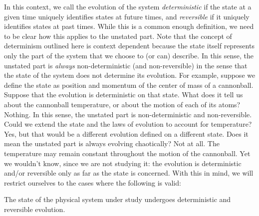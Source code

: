 \documentclass[smallextended]{svjour3}
\numberwithin{equation}{section}
\begin{document}
In this context, we call the evolution of the system \emph{deterministic} if the state at a given time uniquely identifies states at future times, and \emph{reversible} if it uniquely identifies states at past times. While this is a common enough definition, we need to be clear how this applies to the unstated part. Note that the concept of determinism outlined here is context dependent because the state itself represents only the part of the system that we choose to (or can) describe. In this sense, the unstated part is \emph{always} non-deterministic (and non-reversible) in the sense that the state of the system does not determine its evolution. For example, suppose we define the state as position and momentum of the center of mass of a cannonball. Suppose that the evolution is deterministic on that state. What does it tell us about the cannonball temperature, or about the motion of each of its atoms? Nothing. In this sense, the unstated part is non-deterministic and non-reversible. Could we extend the state and the laws of evolution to account for temperature? Yes, but that would be a different evolution defined on a different state. Does it mean the unstated part is always evolving chaotically? Not at all. The temperature may remain constant throughout the motion of the cannonball. Yet we wouldn't know, since we are not studying it: the evolution is deterministic and/or reversible only as far as the state is concerned. With this in mind, we will restrict ourselves to the cases where the following is valid:

\begin{assump}\label{ass:determinism}
The state of the physical system under study undergoes deterministic and reversible evolution.
\end{assump}
\end{document}
